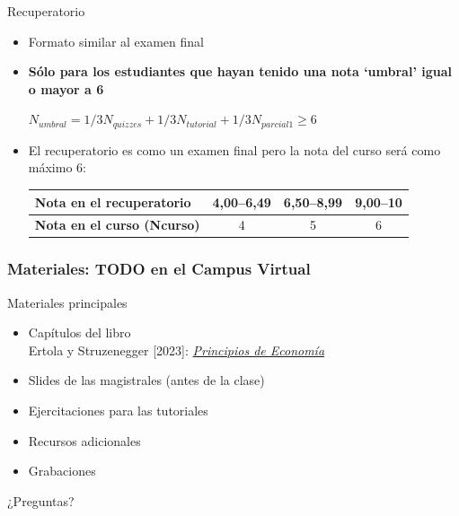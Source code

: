 \documentclass{beamer}
\begin{document}
\begin{frame}{Recuperatorio}
    \begin{itemize}
        \item Formato similar al examen final \vspace{2mm}
        \item \textbf{Sólo para los estudiantes que hayan tenido una nota ‘umbral’ igual o mayor a 6}
        \begin{center}
            $N_{umbral}=1/3N_{quizzes}+1/3N_{tutorial}+1/3N_{parcial 1} \geq 6$
        \end{center}
        \item El recuperatorio es como un examen final pero la nota del curso será como máximo 6:
        \vspace{2mm}
        \begin{tabular}{|l|c|c|c|}
            \hline
            \textbf{Nota en el recuperatorio} & \textbf{4,00--6,49} & \textbf{6,50--8,99} & \textbf{9,00--10} \\
            \hline
            \textbf{Nota en el curso (Ncurso)} & 4 & 5 & 6 \\
            \hline
        \end{tabular}    
    \end{itemize}
\end{frame}

\begin{frame}
\frametitle{Materiales: TODO en el Campus Virtual}
Materiales principales
\begin{itemize}
    \item Capítulos del libro \vspace{2mm}  \\
    Ertola y Struzenegger [2023]:  \textit{\href{https://principiosdeeconomia.com}{Principios de Economía}}
    \item Slides de las magistrales (antes de la clase)
    \item Ejercitaciones para las tutoriales
    \item Recursos adicionales
    \item Grabaciones
\end{itemize}
\end{frame}


\begin{frame}
\begin{center}
    \Huge ¿Preguntas?
\end{center}
\end{frame}
\end{document}
